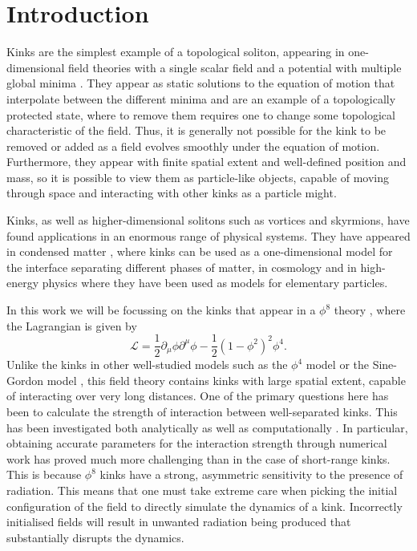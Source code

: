 \documentclass[11pt, oneside]{article}  	%
\numberwithin{equation}{section}
\begin{document}
\section{Introduction}
Kinks are the simplest example of a topological soliton, appearing in one-dimensional field theories with a single scalar field and a potential with multiple global minima \cite{manton_topological_2004,rajaraman_solitons_2005}. They appear as static solutions to the equation of motion that interpolate between the different minima and are an example of a topologically protected state, where to remove them requires one to change some topological characteristic of the field. Thus, it is generally not possible for the kink to be removed or added as a field evolves smoothly under the equation of motion. Furthermore, they appear with finite spatial extent and well-defined position and mass, so it is possible to view them as particle-like objects, capable of moving through space and interacting with other kinks as a particle might.\par
Kinks, as well as higher-dimensional solitons such as vortices and skyrmions, have found applications in an enormous range of physical systems. They have appeared in condensed matter \cite{bishop_solitons_1979,chaikin_walls_1995}, where kinks can be used as a one-dimensional model for the interface separating different phases of matter, in cosmology \cite{vilenkin_cosmic_2001} and in high-energy physics \cite{manton_topological_2004,weinberg_classical_2012} where they have been used as models for elementary particles.\par
In this work we will be focussing on the kinks that appear in a $\phi^8$ theory \cite{manton_forces_2019,christov_long-range_2019}, where the Lagrangian is given by 
\begin{equation}
    \mathcal{L} = \frac{1}{2} \partial_\mu \phi \partial^\mu \phi  - \frac{1}{2} \left ( 1- \phi^2 \right )^2 \phi^4.
\end{equation}
Unlike the kinks in other well-studied models such as the $\phi^4$ model \cite{lohe_soliton_1979,kevrekidis_dynamical_2019} or the Sine-Gordon model \cite{manton_topological_2004,rajaraman_solitons_2005}, this field theory contains kinks with large spatial extent, capable of interacting over very long distances. One of the primary questions here has been to calculate the strength of interaction between well-separated kinks. This has been investigated both analytically \cite{manton_forces_2019,gonzalez_kinks_1989} as well as computationally \cite{christov_long-range_2019,belendryasova_scattering_2019}. In particular, obtaining accurate parameters for the interaction strength through numerical work has proved much more challenging than in the case of short-range kinks. This is because $\phi^8$ kinks have a strong, asymmetric sensitivity to the presence of radiation. This means that one must take extreme care when picking the initial configuration of the field to directly simulate the dynamics of a kink. Incorrectly initialised fields will result in unwanted radiation being produced that substantially disrupts the dynamics.\par
\end{document}
